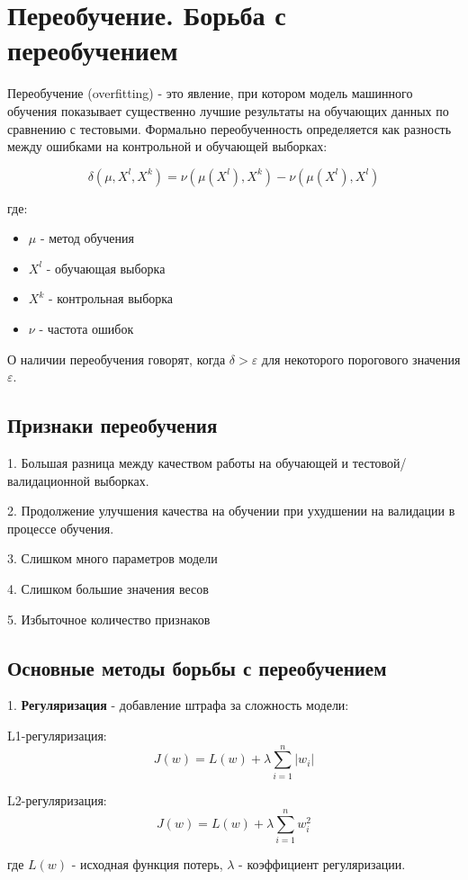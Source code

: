 \section*{Переобучение. Борьба с переобучением}

Переобучение (overfitting) - это явление, при котором модель машинного обучения показывает существенно лучшие результаты на обучающих данных по сравнению с тестовыми. Формально переобученность определяется как разность между ошибками на контрольной и обучающей выборках:

\[\delta(\mu, X^l, X^k) = \nu(\mu(X^l), X^k) - \nu(\mu(X^l), X^l)\]

где:
\begin{itemize}
    \item $\mu$ - метод обучения
    \item $X^l$ - обучающая выборка
    \item $X^k$ - контрольная выборка
    \item $\nu$ - частота ошибок
\end{itemize}

О наличии переобучения говорят, когда $\delta > \varepsilon$ для некоторого порогового значения $\varepsilon$.

\subsection*{Признаки переобучения}

1. Большая разница между качеством работы на обучающей и тестовой/валидационной выборках.

2. Продолжение улучшения качества на обучении при ухудшении на валидации в процессе обучения.

3. Слишком много параметров модели

4. Слишком большие значения весов

5. Избыточное количество признаков

\subsection*{Основные методы борьбы с переобучением}

1. \textbf{Регуляризация} - добавление штрафа за сложность модели:

L1-регуляризация:
\[J(w) = L(w) + \lambda\sum_{i=1}^n |w_i|\]

L2-регуляризация:
\[J(w) = L(w) + \lambda\sum_{i=1}^n w_i^2\]

где $L(w)$ - исходная функция потерь, $\lambda$ - коэффициент регуляризации.

